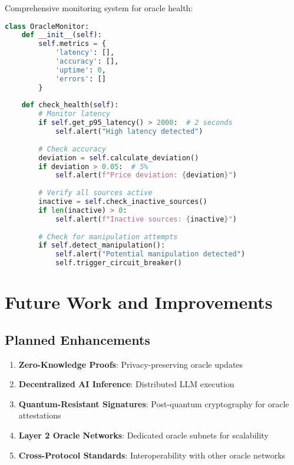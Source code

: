 \documentclass[11pt]{article}
\begin{document}
Comprehensive monitoring system for oracle health:

\begin{lstlisting}[language=Python, caption={Oracle Monitoring System}]
class OracleMonitor:
    def __init__(self):
        self.metrics = {
            'latency': [],
            'accuracy': [],
            'uptime': 0,
            'errors': []
        }
    
    def check_health(self):
        # Monitor latency
        if self.get_p95_latency() > 2000:  # 2 seconds
            self.alert("High latency detected")
        
        # Check accuracy
        deviation = self.calculate_deviation()
        if deviation > 0.05:  # 5%
            self.alert(f"Price deviation: {deviation}")
        
        # Verify all sources active
        inactive = self.check_inactive_sources()
        if len(inactive) > 0:
            self.alert(f"Inactive sources: {inactive}")
        
        # Check for manipulation attempts
        if self.detect_manipulation():
            self.alert("Potential manipulation detected")
            self.trigger_circuit_breaker()
\end{lstlisting}

\section{Future Work and Improvements}

\subsection{Planned Enhancements}

\begin{enumerate}
    \item \textbf{Zero-Knowledge Proofs}: Privacy-preserving oracle updates
    \item \textbf{Decentralized AI Inference}: Distributed LLM execution
    \item \textbf{Quantum-Resistant Signatures}: Post-quantum cryptography for oracle attestations
    \item \textbf{Layer 2 Oracle Networks}: Dedicated oracle subnets for scalability
    \item \textbf{Cross-Protocol Standards}: Interoperability with other oracle networks
\end{enumerate}
\end{document}
